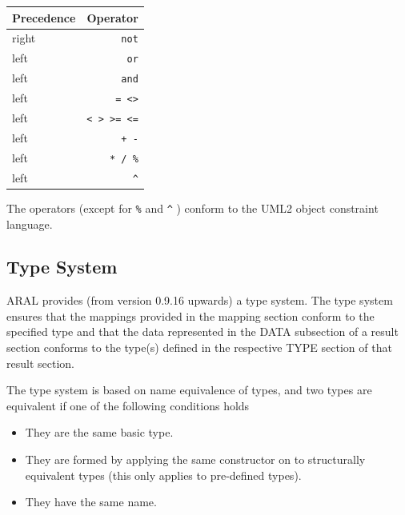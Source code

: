 \documentclass[a4paper,12pt]{report}
\newcommand{\outcomment}[1]{}
\begin{document}
\vspace{0.3cm}
\begin{tabular}{|l|r|}\hline
Precedence & Operator\\\hline\hline
right & \texttt{not}\\\hline
left & \texttt{or}\\\hline
left & \texttt{and}\\\hline
left & \texttt{= <>}\\\hline
left & \texttt{< > >= <=} \\\hline
left & \texttt{+ -}\\\hline
left & \texttt{* / \%}\\\hline
left & \texttt{\^}\\\hline
\end{tabular}

The operators (except for \texttt{\%} and \texttt{\^} ) conform to the UML2 object constraint language.

\outcomment{
{\footnotesize
\vspace{0.2cm} \textbf{Acknowledgements.} 
This work has been partially supported by the ARTIST2 Network of
Excellence 
({http://www.artist-embedded.org/}), and the research project
``Integrating European Timing Analysis Technology'' (ALL-TIMES) under
contract No 215068 funded by the 7th EU R\&D Framework Programme.
}
}

\subsection{Type System}

ARAL provides (from version 0.9.16 upwards) a type system. The type
system ensures that the mappings provided in the mapping section
conform to the specified type and that the data represented in the
DATA subsection of a result section conforms to the type(s) defined in
the respective TYPE section of that result section.

The type system is based on name equivalence of types, and two types are equivalent if one of the following conditions holds

\begin{itemize}
\item They are the same basic type.
\item They are formed by applying the same constructor on to structurally equivalent types (this only applies to pre-defined types).
\item They have the same name.
\end{itemize}
\end{document}
